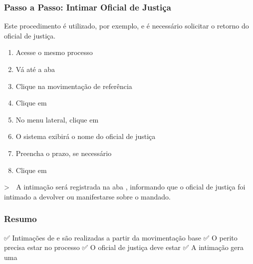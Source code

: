 \documentclass[letterpaper,10pt,brazil]{sphinxmanual}
\begin{document}
\subsubsection{Passo a Passo: Intimar Oficial de Justiça}
\label{\detokenize{projud_34_intimarperitooj:passo-a-passo-intimar-oficial-de-justica}}
\sphinxAtStartPar
Este procedimento é utilizado, por exemplo,  e é necessário solicitar o retorno do oficial de justiça.
\begin{enumerate}
%
\item {} 
\sphinxAtStartPar
Acesse o mesmo processo

\item {} 
\sphinxAtStartPar
Vá até a aba 

\item {} 
\sphinxAtStartPar
Clique na movimentação de referência

\item {} 
\sphinxAtStartPar
Clique em 

\item {} 
\sphinxAtStartPar
No menu lateral, clique em 

\item {} 
\sphinxAtStartPar
O sistema exibirá o nome do oficial de justiça 

\item {} 
\sphinxAtStartPar
Preencha o prazo, se necessário

\item {} 
\sphinxAtStartPar
Clique em 

\end{enumerate}

\sphinxAtStartPar
\textgreater{} 📌 A intimação será registrada na aba , informando que o oficial de justiça foi intimado a devolver ou manifestar\sphinxhyphen{}se sobre o mandado.


\subsubsection{Resumo}
\label{\detokenize{projud_34_intimarperitooj:resumo}}
\sphinxAtStartPar
✅ Intimações de  e  são realizadas a partir da movimentação base
✅ O perito precisa estar  no processo
✅ O oficial de justiça deve estar 
✅ A intimação gera uma 
\end{document}
